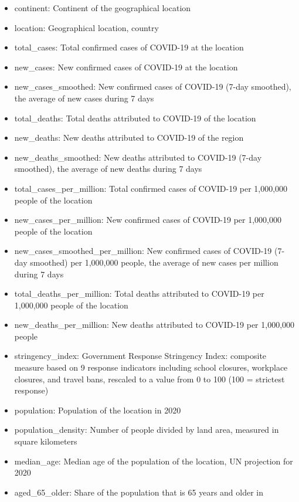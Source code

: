 \documentclass[]{article}
\providecommand{\tightlist}{%
  \setlength{\itemsep}{0pt}\setlength{\parskip}{0pt}}
\begin{document}
\begin{itemize}
\tightlist
\item
  continent: Continent of the geographical location
\item
  location: Geographical location, country
\item
  total\_cases: Total confirmed cases of COVID-19 at the location
\item
  new\_cases: New confirmed cases of COVID-19 at the location
\item
  new\_cases\_smoothed: New confirmed cases of COVID-19 (7-day
  smoothed), the average of new cases during 7 days
\item
  total\_deaths: Total deaths attributed to COVID-19 of the location
\item
  new\_deaths: New deaths attributed to COVID-19 of the region
\item
  new\_deaths\_smoothed: New deaths attributed to COVID-19 (7-day
  smoothed), the average of new deaths during 7 days
\item
  total\_cases\_per\_million: Total confirmed cases of COVID-19 per
  1,000,000 people of the location
\item
  new\_cases\_per\_million: New confirmed cases of COVID-19 per
  1,000,000 people of the location
\item
  new\_cases\_smoothed\_per\_million: New confirmed cases of COVID-19
  (7-day smoothed) per 1,000,000 people, the average of new cases per
  million during 7 days
\item
  total\_deaths\_per\_million: Total deaths attributed to COVID-19 per
  1,000,000 people of the location
\item
  new\_deaths\_per\_million: New deaths attributed to COVID-19 per
  1,000,000 people
\item
  stringency\_index: Government Response Stringency Index: composite
  measure based on 9 response indicators including school closures,
  workplace closures, and travel bans, rescaled to a value from 0 to 100
  (100 = strictest response)
\item
  population: Population of the location in 2020\\
\item
  population\_density: Number of people divided by land area, measured
  in square kilometers
\item
  median\_age: Median age of the population of the location, UN
  projection for 2020\\
\item
  aged\_65\_older: Share of the population that is 65 years and older in

\end{itemize}
\end{document}
